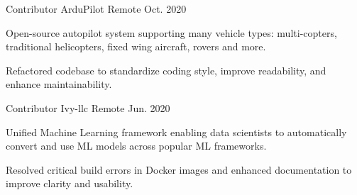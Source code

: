 \begin{cventries}
  \cventry
    {Contributor} %
    {ArduPilot} %
    {Remote} %
    {Oct. 2020} %
    {
      \begin{cvitems} %
        \item {Open-source autopilot system supporting many vehicle types: multi-copters, traditional helicopters, fixed wing aircraft, rovers and more.}
        \item {Refactored codebase to standardize coding style, improve readability, and enhance maintainability.}
      \end{cvitems}
    }

  \cventry
    {Contributor} %
    {Ivy-llc} %
    {Remote} %
    {Jun. 2020} %
    {
      \begin{cvitems} %
        \item {Unified Machine Learning framework enabling data scientists to automatically convert and use ML models across popular ML frameworks.}
        \item {Resolved critical build errors in Docker images and enhanced documentation to improve clarity and usability.}
      \end{cvitems}
    }

\end{cventries}
